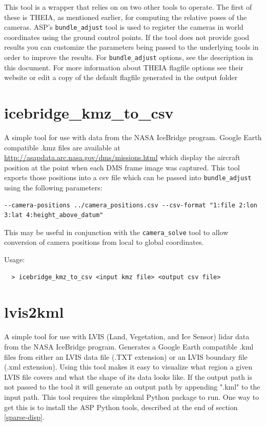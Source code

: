 This tool is a wrapper that relies on on two other tools to operate.
The first of these is THEIA, as mentioned earlier, for computing the
relative poses of the cameras.  ASP's \texttt{bundle\_adjust} tool is
used to register the cameras in world coordinates using the ground
control points.  If the tool does not provide good results you can
customize the parameters being passed to the underlying tools in order
to improve the results.  For \texttt{bundle\_adjust} options, see the
description in this document.  For more information about THEIA flagfile
options see their website or edit a copy of the default flagfile
generated in the output folder



\section{icebridge\_kmz\_to\_csv}
\label{icebridgekmztocsv}

A simple tool for use with data from the NASA IceBridge program.  Google Earth compatible
.kmz files are available at \url{http://asapdata.arc.nasa.gov/dms/missions.html} which display
the aircraft position at the point when each DMS frame image was captured.  This tool exports
those positions into a csv file which can be passed into \texttt{bundle\_adjust} using
the following parameters:
\begin{verbatim}
--camera-positions ../camera_positions.csv --csv-format "1:file 2:lon 3:lat 4:height_above_datum"
\end{verbatim}
This may be useful in conjunction with the \texttt{camera\_solve} tool to allow conversion of camera
positions from local to global coordinates.

Usage:
\begin{verbatim}
  > icebridge_kmz_to_csv <input kmz file> <output csv file>
\end{verbatim}



\section{lvis2kml}
\label{lvis2kml}

A simple tool for use with LVIS (Land, Vegetation, and Ice Sensor) lidar data from the
NASA IceBridge program.  Generates a Google Earth compatible .kml files from either
an LVIS data file (.TXT extension) or an LVIS boundary file (.xml extension).  Using
this tool makes it easy to visualize what region a given LVIS file covers and what
the shape of its data looks like.  If the output path is not passed to the tool it
will generate an output path by appending ".kml" to the input path.  This tool requires
the simplekml Python package to run.  One way to get this is to install the ASP Python
tools, described at the end of section \ref{sparse-disp}.

